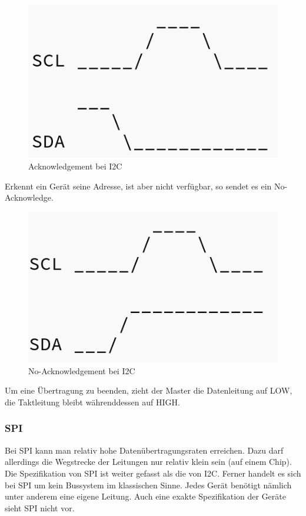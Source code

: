 \begin{figure}[h!] 
\includegraphics[scale=0.3]{bilder/i2c_ack}
\caption[I2C Acknowledgement]{Acknowledgement bei \ac{I2C} \cite{cc}}
\label{i2c_ack}
\end{figure}


Erkennt ein Gerät seine Adresse, ist aber nicht verfügbar, so sendet es ein No-Acknowledge.

\begin{figure}[h!] 
\includegraphics[scale=0.3]{bilder/i2C_noAck}
\caption[I2C No-Acknowledgement]{No-Acknowledgement bei \ac{I2C} \cite{cc}}
\label{i2c_NoAck}
\end{figure}

Um eine Übertragung zu beenden, zieht der Master die Datenleitung auf LOW, die Taktleitung bleibt währenddessen auf HIGH. 

\cite{dembowski2015raspberry} \cite{lehmann}


\subsubsection{\ac{SPI}}
Bei \ac{SPI} kann man relativ hohe Datenübertragungsraten erreichen. Dazu darf allerdings die Wegstrecke der Leitungen nur relativ klein sein (auf einem Chip). Die Spezifikation von \ac{SPI} ist weiter gefasst als die von \ac{I2C}. Ferner handelt es sich bei \ac{SPI} um kein Bussystem im klassischen Sinne. Jedes Gerät benötigt nämlich unter anderem eine eigene Leitung. Auch eine exakte Spezifikation der Geräte sieht \ac{SPI} nicht vor. 

